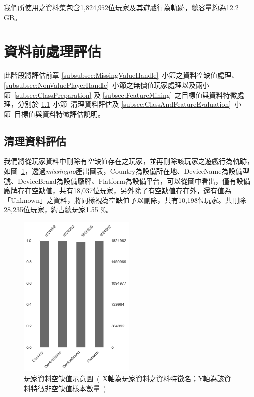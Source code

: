 我們所使用之資料集包含1,824,962位玩家及其遊戲行為軌跡，總容量約為12.2 GB。
\newpage

\section{資料前處理評估}
\label{sec:DataPreprocessEvaluation}

此階段將評估前章 \ref{subsubsec:MissingValueHandle}~小節之資料空缺值處理、\ref{subsubsec:NonValuePlayerHandle}~小節之無價值玩家處理以及兩小節~\ref{subsec:ClassPreparation} 及 \ref{subsec:FeatureMining} 之目標值與資料特徵處理，分別於 \ref{subsec:CleanDataEvaluation}~小節\ 清理資料評估及 \ref{subsec:ClassAndFeatureEvaluation}~小節\ 目標值與資料特徵評估說明。

\subsection{清理資料評估}
\label{subsec:CleanDataEvaluation}

我們將從玩家資料中刪除有空缺值存在之玩家，並再刪除該玩家之遊戲行為軌跡，如圖~\ref{fig:eva_MissingValueHandle}，透過\emph{missingno}產出圖表，Country為設備所在地、DeviceName為設備型號、DeviceBrand為設備廠牌、Platform為設備平台，可以從圖中看出，僅有設備廠牌存在空缺值，共有18,037位玩家，另外除了有空缺值存在外，還有值為「Unknown」之資料，將同樣視為空缺值予以刪除，共有10,198位玩家。共刪除28,235位玩家，約占總玩家1.55 \%。

\begin{figure}[!htb]
    \begin{center}
      \includegraphics[width=0.5\textwidth]{figures/evaluation/Image_MissingValueHandle.png}
      \caption[玩家資料空缺值示意圖]{玩家資料空缺值示意圖\ (\ X軸為玩家資料之資料特徵名；Y軸為該資料特徵非空缺值樣本數量\ )\ }
      \label{fig:eva_MissingValueHandle}
    \end{center}
\end{figure}
\newpage

